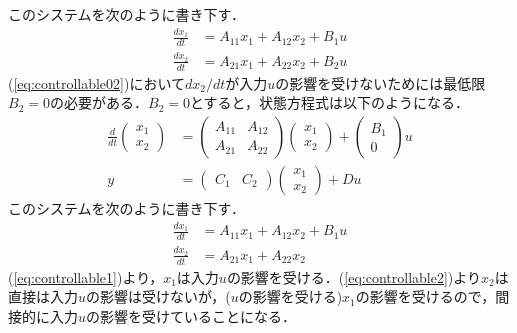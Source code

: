 このシステムを次のように書き下す．
\begin{align}
 \frac{dx_1}{dt} &= A_{11} x_1 + A_{12} x_2 + B_1 u
\label{eq:controllable01} \\
 \frac{dx_2}{dt} &= A_{21} x_1 + A_{22} x_2 + B_2 u
\label{eq:controllable02}
\end{align}
(\ref{eq:controllable02})において$dx_2/dt$が入力$u$の影響を受けないためには最低限$B_2=0$の必要がある．$B_2=0$とすると，状態方程式は以下のようになる．
\begin{align}
 \frac{d}{dt}
  \left(\begin{array}{c}
         {x}_1 \\
	 {x}_2 
	\end{array}\right)
  &=
  \left(\begin{array}{cc}
         {A}_{11} & {A}_{12} \\
	     {A}_{21} & {A}_{22}
	\end{array}\right)
  \left(\begin{array}{c}
         {x}_1 \\
	 {x}_2 
	\end{array}\right)
  +
  \left(\begin{array}{c}
         {B}_1 \\
	 0
	\end{array}\right)
  u \\
 y &=
  \left(\begin{array}{cc}
         {C}_1 & {C}_2 
	\end{array}\right)
  \left(\begin{array}{c}
         {x}_1 \\
	 {x}_2 
	\end{array}\right)
  + D u
\end{align}
このシステムを次のように書き下す．
\begin{align}
 \frac{dx_1}{dt} &= A_{11} x_1 + A_{12} x_2 + B_1 u
\label{eq:controllable1} \\
 \frac{dx_2}{dt} &= A_{21} x_1 + A_{22} x_2
\label{eq:controllable2}
\end{align}
(\ref{eq:controllable1})より，$x_1$は入力$u$の影響を受ける．(\ref{eq:controllable2})より$x_2$は直接は入力$u$の影響は受けないが，($u$の影響を受ける)$x_1$の影響を受けるので，間接的に入力$u$の影響を受けていることになる．

